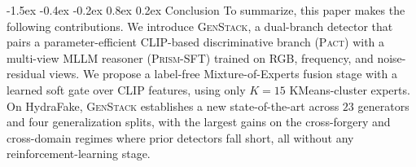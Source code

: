 \documentclass[10pt,twocolumn,letterpaper]{article}
\makeatletter
\renewcommand\section{\@startsection{section}{1}{\z@}%
  {-1.5ex \@plus -0.4ex \@minus -0.2ex}%
  {0.8ex \@plus 0.2ex}%
  {\normalfont\large\bfseries}}
\newcommand{\vfive}{\textsc{Pact}}
\newcommand{\prism}{\textsc{Prism-SFT}}
\makeatother
\begin{document}

\section{Conclusion}
\label{sec:conclusion}
To summarize, this paper makes the following contributions. We introduce \textsc{GenStack}, a dual-branch detector that pairs a parameter-efficient CLIP-based discriminative branch (\vfive) with a multi-view MLLM reasoner (\prism) trained on RGB, frequency, and noise-residual views. We propose a label-free Mixture-of-Experts fusion stage with a learned soft gate over CLIP features, using only $K{=}15$ KMeans-cluster experts. On HydraFake, \textsc{GenStack} establishes a new state-of-the-art across $23$ generators and four generalization splits, with the largest gains on the cross-forgery and cross-domain regimes where prior detectors fall short, all without any reinforcement-learning stage. 

{\small


}
\end{document}

